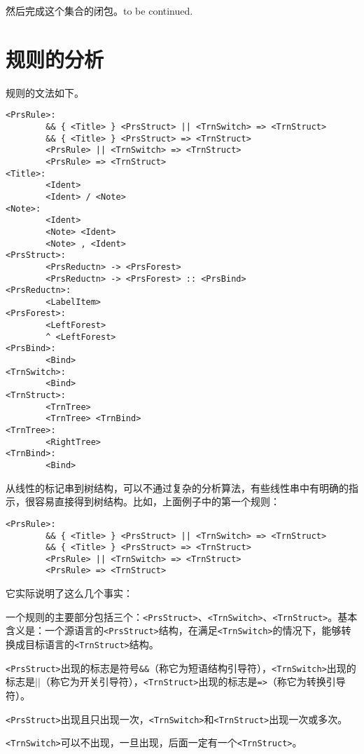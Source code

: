 \documentclass{article}
\begin{document}
\begin{CJK}{UTF8}{gbsn}
\vspace{1pc}
然后完成这个集合的闭包。to be continued.

\section{规则的分析}

规则的文法如下。

\vspace{1pc}
\begin{verbatim}
<PrsRule>:
        && { <Title> } <PrsStruct> || <TrnSwitch> => <TrnStruct>
        && { <Title> } <PrsStruct> => <TrnStruct>
        <PrsRule> || <TrnSwitch> => <TrnStruct>
        <PrsRule> => <TrnStruct>
<Title>:
        <Ident>
        <Ident> / <Note>
<Note>:
        <Ident>
        <Note> <Ident>
        <Note> , <Ident>
<PrsStruct>:
        <PrsReductn> -> <PrsForest>
        <PrsReductn> -> <PrsForest> :: <PrsBind>
<PrsReductn>:
        <LabelItem>
<PrsForest>:
        <LeftForest>
        ^ <LeftForest>
<PrsBind>:
        <Bind>
<TrnSwitch>:
        <Bind>
<TrnStruct>:
        <TrnTree>
        <TrnTree> <TrnBind>
<TrnTree>:
        <RightTree>
<TrnBind>:
        <Bind>
\end{verbatim}

从线性的标记串到树结构，可以不通过复杂的分析算法，有些线性串中有明确的指示，很容易直接得到树结构。比如，上面例子中的第一个规则：
\begin{verbatim}
<PrsRule>:
        && { <Title> } <PrsStruct> || <TrnSwitch> => <TrnStruct>
        && { <Title> } <PrsStruct> => <TrnStruct>
        <PrsRule> || <TrnSwitch> => <TrnStruct>
        <PrsRule> => <TrnStruct>
\end{verbatim}
它实际说明了这么几个事实：
\begin{itemize*}
\item 一个规则的主要部分包括三个：\verb|<PrsStruct>|、\verb|<TrnSwitch>|、\verb|<TrnStruct>|。基本含义是：一个源语言的\verb|<PrsStruct>|结构，在满足\verb|<TrnSwitch>|的情况下，能够转换成目标语言的\verb|<TrnStruct>|结构。
\item \verb|<PrsStruct>|出现的标志是符号\verb|&&|（称它为短语结构引导符），\verb|<TrnSwitch>|出现的标志是$||$（称它为开关引导符），\verb|<TrnStruct>|出现的标志是\verb|=>|（称它为转换引导符）。
\item \verb|<PrsStruct>|出现且只出现一次，\verb|<TrnSwitch>|和\verb|<TrnStruct>|出现一次或多次。
\item \verb|<TrnSwitch>|可以不出现，一旦出现，后面一定有一个\verb|<TrnStruct>|。
\end{itemize*}


\end{CJK}
\end{document}
